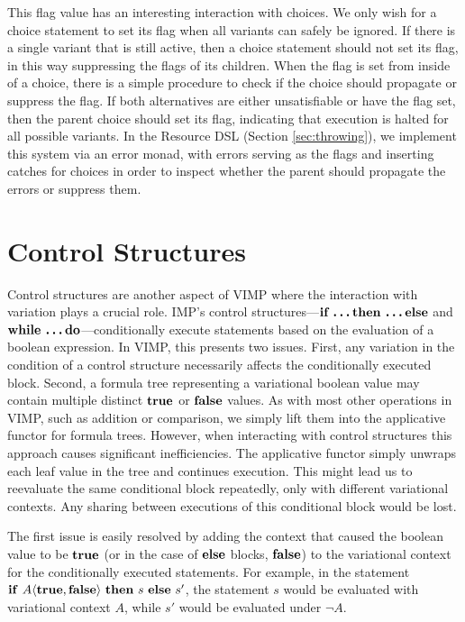 \documentclass[12pt,oneside]{book}
\begin{document}
This flag value has an interesting interaction with choices. We only wish for a choice statement to set its flag when all variants can safely be ignored. If there is a single variant that is still active, then a choice statement should not set its flag, in this way suppressing the flags of its children. When the flag is set from inside of
a choice, there is a simple procedure to check if the choice should propagate or suppress the flag. If both alternatives are either unsatisfiable or have the flag set, then
the parent choice should set its flag, indicating that execution is halted for all possible variants. In the Resource DSL (Section \ref{sec:throwing}), we implement this system via an error monad,
with errors serving as the flags and inserting catches for choices in order to inspect whether the parent should propagate the errors or suppress them.

\section{Control Structures}
\label{sec:control}

Control structures are another aspect of VIMP where the interaction with variation plays a crucial role. IMP's control structures---$\textbf{\textup{\textrm{if \ldots then \ldots else}}}$ and $\textbf{\textup{\textrm{while \ldots do}}}$---conditionally execute statements based on the evaluation of a boolean expression. In VIMP, this presents two issues. First, any variation in the condition of a control structure
necessarily affects the conditionally executed block. Second, a formula tree representing a variational boolean
value may contain multiple distinct $\textbf{\textup{\textrm{true}}}$ or $\textbf{\textup{\textrm{false}}}$ values. As with most other operations in VIMP, such as addition or comparison, we simply lift them into the applicative functor for formula trees.
However, when interacting with control structures this approach causes significant inefficiencies. The applicative functor simply unwraps each leaf value in the tree
and continues execution. This might lead us to reevaluate the same conditional block repeatedly, only with different variational contexts. Any sharing between executions of this
conditional block would be lost. 

The first issue is easily resolved by adding the context that caused the boolean value to be $\textbf{\textup{\textrm{true}}}$ (or in the case of $\textbf{\textup{\textrm{else}}}$ blocks, $\textbf{\textup{\textrm{false}}}$)
to the variational context for the conditionally executed statements. For example, in the statement
$\CCkeyw{if}\ \tagtree{A}{\CCkeyw{true}}{\CCkeyw{false}}\ \CCkeyw{then}\ s\ \CCkeyw{else}\ s'$, the statement $s$ would be evaluated with variational context $A$, while
$s'$ would be evaluated under $\neg A$.
\end{document}

